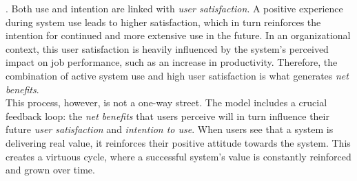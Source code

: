 \documentclass[
	english,
	ruledheaders=section,%
	class=report,%
	thesis={type=bachelor},%
	accentcolor=1b,%
	custommargins=true,%
	marginpar=false,%
	parskip=half-,%
	fontsize=11pt,%
	DIV=14,
]{tudapub}
\begin{document}
\parencite{DeloneMcLean2003ISSuccessTenYearUpdate}. Both use and intention are linked with \textit{user satisfaction}. A positive experience during system use leads to higher satisfaction, which in turn reinforces the intention for continued and more extensive use in the future. In an organizational context, this user satisfaction is heavily influenced by the system's perceived impact on job performance, such as an increase in productivity. Therefore, the combination of active system use and high user satisfaction is what generates \textit{net benefits}.\\
This process, however, is not a one-way street. The model includes a crucial feedback loop: the \textit{net benefits} that users perceive will in turn influence their future \textit{user satisfaction} and \textit{intention to use}. When users see that a system is delivering real value, it reinforces their positive attitude towards the system. This creates a virtuous cycle, where a successful system's value is constantly reinforced and grown over time.
\newpage
\end{document}
